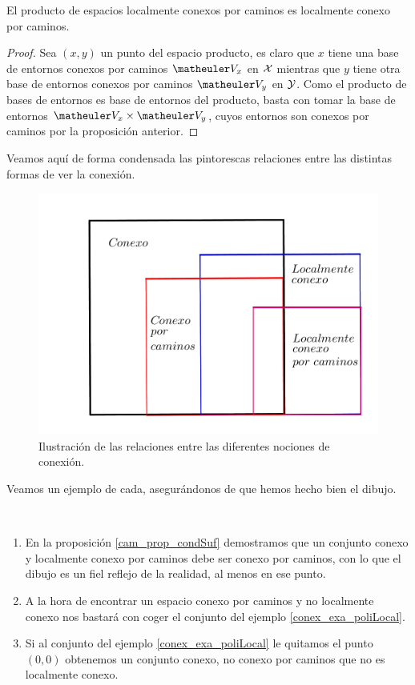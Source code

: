 \begin{cor}
	El producto de espacios localmente conexos por caminos es localmente conexo por caminos.
\end{cor}
\begin{proof}
	Sea $(x,y)$ un punto del espacio producto, es claro que $x$ tiene una base de entornos conexos por caminos $\Va{x}$ en $\mathcal{X}$ mientras que $y$ tiene otra base de entornos conexos por caminos $\Va{y}$ en $\mathcal{Y}$. Como el producto de bases de entornos es base de entornos del producto, basta con tomar la base de entornos $\Va{x}\times\Va{y}$, cuyos entornos son conexos por caminos por la proposición anterior.
\end{proof}
Veamos aquí de forma condensada las pintorescas relaciones entre las distintas formas de ver la conexión.
\begin{figure}[h!]
	\centering
	\includegraphics[scale = 1]{img/Comparacion_conexion}
	\caption{Ilustración de las relaciones entre las diferentes nociones de conexión.}
\end{figure}
Veamos un ejemplo de cada, asegurándonos de que hemos hecho bien el dibujo.
\begin{exa}\
	\begin{enumerate}
		\item En la proposición \ref{cam_prop_condSuf} demostramos que un conjunto conexo y localmente conexo por caminos debe ser conexo por caminos, con lo que el dibujo es un fiel reflejo de la realidad, al menos en ese punto.
		\item A la hora de encontrar un espacio conexo por caminos y no localmente conexo nos bastará con coger el conjunto del ejemplo \ref{conex_exa_poliLocal}.
		\item Si al conjunto del ejemplo  \ref{conex_exa_poliLocal} le quitamos el punto $(0,0)$ obtenemos un conjunto conexo, no conexo por caminos que no es localmente conexo.\qedhere
	\end{enumerate}
\end{exa}
